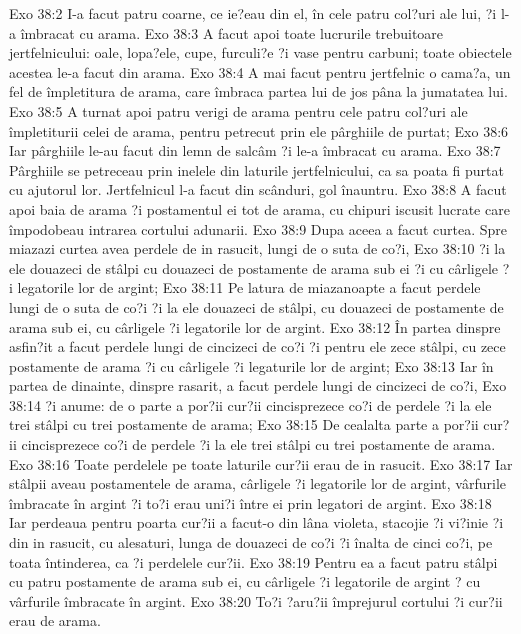 Exo 38:2  I-a facut patru coarne, ce ie?eau din el, în cele patru col?uri ale lui, ?i l-a îmbracat cu arama.
Exo 38:3  A facut apoi toate lucrurile trebuitoare jertfelnicului: oale, lopa?ele, cupe, furculi?e ?i vase pentru carbuni; toate obiectele acestea le-a facut din arama.
Exo 38:4  A mai facut pentru jertfelnic o cama?a, un fel de împletitura de arama, care îmbraca partea lui de jos pâna la jumatatea lui.
Exo 38:5  A turnat apoi patru verigi de arama pentru cele patru col?uri ale împletiturii celei de arama, pentru petrecut prin ele pârghiile de purtat;
Exo 38:6  Iar pârghiile le-au facut din lemn de salcâm ?i le-a îmbracat cu arama.
Exo 38:7  Pârghiile se petreceau prin inelele din laturile jertfelnicului, ca sa poata fi purtat cu ajutorul lor. Jertfelnicul l-a facut din scânduri, gol înauntru.
Exo 38:8  A facut apoi baia de arama ?i postamentul ei tot de arama, cu chipuri iscusit lucrate care împodobeau intrarea cortului adunarii.
Exo 38:9  Dupa aceea a facut curtea. Spre miazazi curtea avea perdele de in rasucit, lungi de o suta de co?i,
Exo 38:10  ?i la ele douazeci de stâlpi cu douazeci de postamente de arama sub ei ?i cu cârligele ?i legatorile lor de argint;
Exo 38:11  Pe latura de miazanoapte a facut perdele lungi de o suta de co?i ?i la ele douazeci de stâlpi, cu douazeci de postamente de arama sub ei, cu cârligele ?i legatorile lor de argint.
Exo 38:12  În partea dinspre asfin?it a facut perdele lungi de cincizeci de co?i ?i pentru ele zece stâlpi, cu zece postamente de arama ?i cu cârligele ?i legaturile lor de argint;
Exo 38:13  Iar în partea de dinainte, dinspre rasarit, a facut perdele lungi de cincizeci de co?i,
Exo 38:14  ?i anume: de o parte a por?ii cur?ii cincisprezece co?i de perdele ?i la ele trei stâlpi cu trei postamente de arama;
Exo 38:15  De cealalta parte a por?ii cur?ii cincisprezece co?i de perdele ?i la ele trei stâlpi cu trei postamente de arama.
Exo 38:16  Toate perdelele pe toate laturile cur?ii erau de in rasucit.
Exo 38:17  Iar stâlpii aveau postamentele de arama, cârligele ?i legatorile lor de argint, vârfurile îmbracate în argint ?i to?i erau uni?i între ei prin legatori de argint.
Exo 38:18  Iar perdeaua pentru poarta cur?ii a facut-o din lâna violeta, stacojie ?i vi?inie ?i din in rasucit, cu alesaturi, lunga de douazeci de co?i ?i înalta de cinci co?i, pe toata întinderea, ca ?i perdelele cur?ii.
Exo 38:19  Pentru ea a facut patru stâlpi cu patru postamente de arama sub ei, cu cârligele ?i legatorile de argint ? cu vârfurile îmbracate în argint.
Exo 38:20  To?i ?aru?ii împrejurul cortului ?i cur?ii erau de arama.
